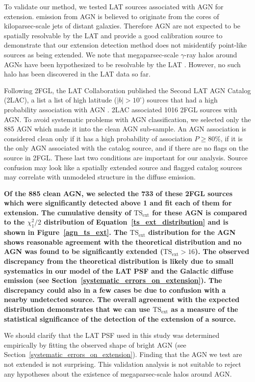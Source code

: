 \documentclass[12pt,preprint]{aastex}
\newcommand{\gev}{\text{GeV}\xspace}
\newcommand{\tsext}{{\ensuremath{\text{TS}_{\text{ext}}}}\xspace}
\newcommand{\degree}{^\circ\xspace}
\newcommand{\newtext}[1]{{\bfseries \color{red}#1}}
\begin{document}
To validate our method, we tested LAT sources associated with AGN for
extension.  \gev emission from AGN is believed to originate from the
cores of kiloparsec-scale jets of distant galaxies.  Therefore AGN are
not expected to be spatially resolvable by the LAT and provide a good
calibration source to demonstrate that our extension detection method
does not misidentify point-like sources as being extended.  We note that
megaparsec-scale $\gamma$-ray halos around AGNs have been hypothesized
to be resolvable by the LAT \citep{pair_halo_paper}. However, no such
halo has been discovered in the LAT data so far.

Following 2FGL, the LAT Collaboration published the Second LAT AGN
Catalog (2LAC), a list a list of high latitude ($|b|>10\degree$) sources
that had a high probability association with AGN \citep{second_agn_cat}.
2LAC associated 1016 2FGL sources with AGN.  To avoid systematic problems
with AGN classification, we selected only the 885 AGN which made it into
the clean AGN sub-sample.  An AGN association is considered clean only
if it has a high probability of association $P\ge 80\%$, if it is the
only AGN associated with the catalog source, and if there are no flags
on the source in 2FGL. These last two conditions are important for our
analysis. Source confusion may look like a spatially extended source
and flagged catalog sources may correlate with unmodeled structure in
the diffuse emission.

\newtext{
Of the 885 clean AGN, we selected the 733 of these 2FGL sources which
were significantly detected above 1 \gev and fit each of them for
extension.  The cumulative density of \tsext for these AGN is compared
to the $\chi^2_1/2$ distribution of Equation~\ref{ts_ext_distribution}
and is shown in Figure~\ref{agn_ts_ext}.  The \tsext distribution
for the AGN shows reasonable agreement with the theoretical
distribution and no AGN was found to be significantly extended
($\tsext>16$).  The observed discrepancy from the theoretical
distribution is likely due to small systematics
in our model of the LAT PSF and the Galactic diffuse emission (see
Section~\ref{systematic_errors_on_extension}).  The discrepancy could
also in a few cases be due to confusion with a nearby undetected source.
The overall agreement with the expected distribution demonstrates that
we can use \tsext as a measure of the statistical significance of the
detection of the extension of a source.
}

We should clarify that the LAT PSF used in this study was determined
empirically by fitting the observed shape of bright AGN (see
Section~\ref{systematic_errors_on_extension}). Finding that the AGN we
test are not extended is not surprising.  This validation analysis is
not suitable to reject any hypotheses about the existence of megaparsec-scale
halos around AGN.
\end{document}
